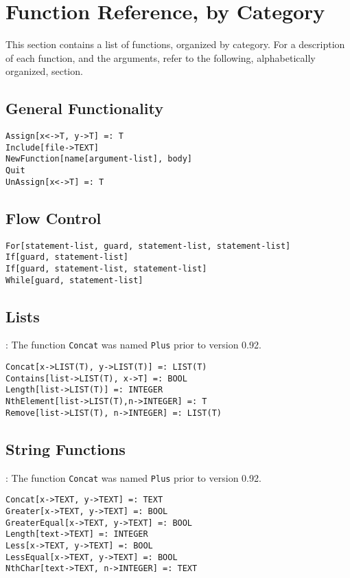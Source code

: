\section{Function Reference, by Category}

This section contains a list of functions, organized by
category.  For a description of each function, and the arguments,
refer to the following, alphabetically organized, section.

\subsection{General Functionality}

\begin{verbatim}
Assign[x<->T, y->T] =: T
Include[file->TEXT]
NewFunction[name[argument-list], body]
Quit
UnAssign[x<->T] =: T
\end{verbatim}

\subsection{Flow Control}

\begin{verbatim}
For[statement-list, guard, statement-list, statement-list]
If[guard, statement-list]
If[guard, statement-list, statement-list]
While[guard, statement-list]
\end{verbatim}

\subsection{Lists}

: The function {\tt Concat} was named {\tt Plus}
prior to version 0.92.

\begin{verbatim}
Concat[x->LIST(T), y->LIST(T)] =: LIST(T)
Contains[list->LIST(T), x->T] =: BOOL
Length[list->LIST(T)] =: INTEGER
NthElement[list->LIST(T),n->INTEGER] =: T 
Remove[list->LIST(T), n->INTEGER] =: LIST(T)
\end{verbatim}

\subsection{String Functions}

: The function {\tt Concat} was named {\tt Plus}
prior to version 0.92.

\begin{verbatim}
Concat[x->TEXT, y->TEXT] =: TEXT
Greater[x->TEXT, y->TEXT] =: BOOL
GreaterEqual[x->TEXT, y->TEXT] =: BOOL
Length[text->TEXT] =: INTEGER
Less[x->TEXT, y->TEXT] =: BOOL
LessEqual[x->TEXT, y->TEXT] =: BOOL
NthChar[text->TEXT, n->INTEGER] =: TEXT
\end{verbatim}


